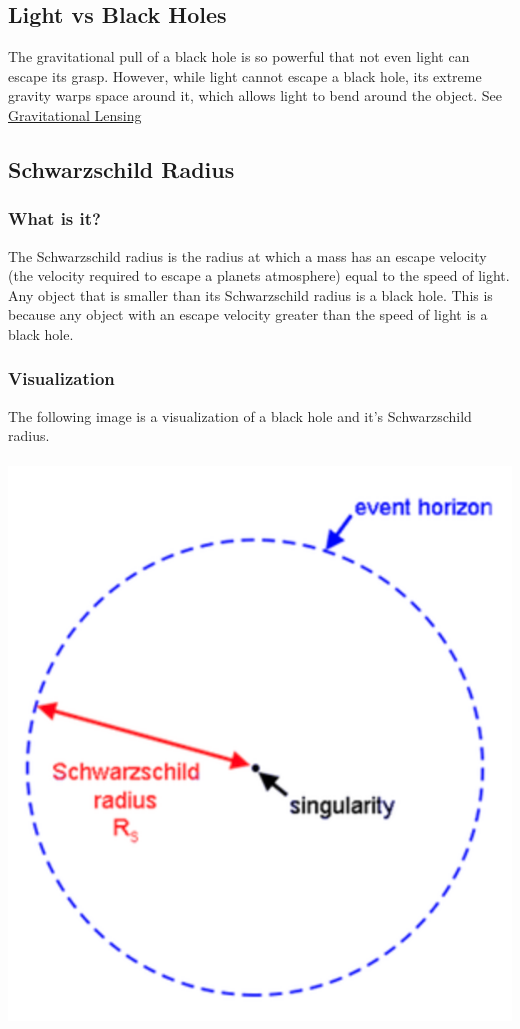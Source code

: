 \documentclass{article}
\begin{document}
\subsection{Light vs Black Holes}
The gravitational pull of a black hole is so powerful that not even light can escape its grasp. However, while light cannot escape a black hole, its extreme gravity warps space around it, which allows light to bend around the object. See \hyperref[sec:gravitational_lensing]{Gravitational Lensing}

\subsection{Schwarzschild Radius}
\subsubsection{What is it?}
The Schwarzschild radius is the radius at which a mass has an escape velocity (the velocity required to escape a planets atmosphere) equal to the speed of light. Any object that is smaller than its Schwarzschild radius is a black hole. This is because any object with an escape velocity greater than the speed of light is a black hole.

\subsubsection{Visualization}
The following image is a visualization of a black hole and it's Schwarzschild radius. \\\\
\includegraphics[scale=0.4]{images/schwarzschild_radius.png}
\end{document}
